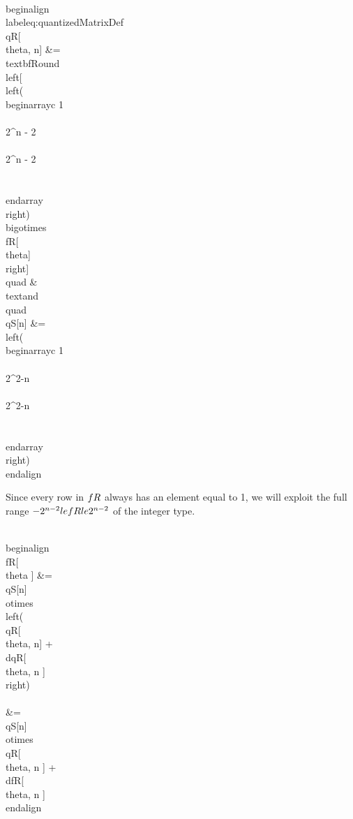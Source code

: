 \\begin{align}\\label{eq:quantizedMatrixDef}
 \\qR[\\theta, n] &=
\\textbf{Round}\\left[
\\left(
\\begin{array}{c}
 1  \\\\
 2^{n - 2} \\\\
 2^{n - 2}  \\\\
\\end{array}
\\right)
\\bigotimes
\\fR[\\theta] \\right] 
\\quad &\\text{and} \\quad 
\\qS[n] &= \\left(
\\begin{array}{c}
 1  \\\\
 2^{2-n } \\\\
 2^{2-n }  \\\\
\\end{array}
\\right) 
\\end{align}



Since every row in $\\fR$ always has an element equal to 1, we will exploit the full range $ -2^{n-2} \\le \\fR \\le 2^{n-2}$ of the integer type. 

\\begin{align}
\\fR[ \\theta ] &= \\qS[n]  \\otimes \\left( \\qR[ \\theta, n]  + \\dqR[ \\theta, n ] \\right)  \\\\
                  &= \\qS[n]  \\otimes \\qR[ \\theta, n ] +  \\dfR[ \\theta, n ] 
\\end{align}

